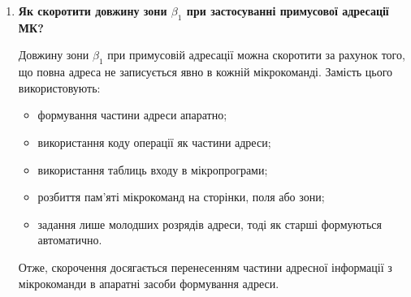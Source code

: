 \documentclass[12pt,a4paper]{article}
\begin{document}
\begin{enumerate}
        \textbf{Абсолютна адресація:}
        у мікрокоманді безпосередньо задається повна адреса наступної мікрокоманди.
        \begin{itemize}
            \item переваги: простота, наочність;
            \item недоліки: велика довжина адресної частини.
        \end{itemize}

        \textbf{Відносна адресація:}
        задається не повна адреса, а приріст або зміщення відносно поточної адреси.
        \begin{itemize}
            \item переваги: менша довжина зони $\beta_1$;
            \item недоліки: складніша схема формування адреси переходу.
        \end{itemize}

        \textbf{Примусова адресація:}
        наступна адреса формується з використанням зовнішніх умов, коду операції, ознак або спеціальних схем переходу.
        \begin{itemize}
            \item переваги: висока гнучкість, зручність організації розгалужень;
            \item недоліки: складніша апаратна реалізація.
        \end{itemize}

        \item \textbf{Як скоротити довжину зони $\beta_1$ при застосуванні примусової адресації МК?}

        Довжину зони $\beta_1$ при примусовій адресації можна скоротити за рахунок того, що повна адреса не записується явно в кожній мікрокоманді. Замість цього використовують:
        \begin{itemize}
            \item формування частини адреси апаратно;
            \item використання коду операції як частини адреси;
            \item використання таблиць входу в мікропрограми;
            \item розбиття пам'яті мікрокоманд на сторінки, поля або зони;
            \item задання лише молодших розрядів адреси, тоді як старші формуються автоматично.
        \end{itemize}

        Отже, скорочення досягається перенесенням частини адресної інформації з мікрокоманди в апаратні засоби формування адреси.


\end{enumerate}
\end{document}
